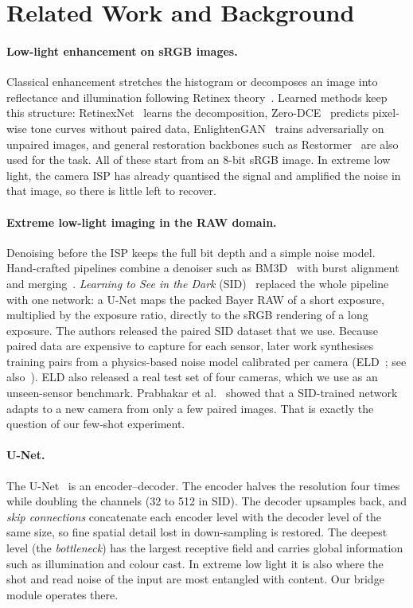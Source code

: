 \section{Related Work and Background}
\label{sec:related}

\paragraph{Low-light enhancement on sRGB images.}
Classical enhancement stretches the histogram or decomposes an image into reflectance and illumination following Retinex theory~\cite{land1977retinex}. Learned methods keep this structure: RetinexNet~\cite{wei2018retinexnet} learns the decomposition, Zero-DCE~\cite{guo2020zerodce} predicts pixel-wise tone curves without paired data, EnlightenGAN~\cite{jiang2021enlightengan} trains adversarially on unpaired images, and general restoration backbones such as Restormer~\cite{zamir2022restormer} are also used for the task. All of these start from an 8-bit sRGB image. In extreme low light, the camera ISP has already quantised the signal and amplified the noise in that image, so there is little left to recover.

\paragraph{Extreme low-light imaging in the RAW domain.}
Denoising before the ISP keeps the full bit depth and a simple noise model. Hand-crafted pipelines combine a denoiser such as BM3D~\cite{dabov2007bm3d} with burst alignment and merging~\cite{hasinoff2016burst}. \emph{Learning to See in the Dark} (SID)~\cite{chen2018sid} replaced the whole pipeline with one network: a U-Net maps the packed Bayer RAW of a short exposure, multiplied by the exposure ratio, directly to the sRGB rendering of a long exposure. The authors released the paired SID dataset that we use. Because paired data are expensive to capture for each sensor, later work synthesises training pairs from a physics-based noise model calibrated per camera (ELD~\cite{wei2020eld,wei2021eldpami}; see also~\cite{zhang2021rethinking}). ELD also released a real test set of four cameras, which we use as an unseen-sensor benchmark. Prabhakar et al.~\cite{prabhakar2021fewshot} showed that a SID-trained network adapts to a new camera from only a few paired images. That is exactly the question of our few-shot experiment.

\paragraph{U-Net.}
The U-Net~\cite{ronneberger2015unet} is an encoder--decoder. The encoder halves the resolution four times while doubling the channels (32 to 512 in SID). The decoder upsamples back, and \emph{skip connections} concatenate each encoder level with the decoder level of the same size, so fine spatial detail lost in down-sampling is restored. The deepest level (the \emph{bottleneck}) has the largest receptive field and carries global information such as illumination and colour cast. In extreme low light it is also where the shot and read noise of the input are most entangled with content. Our bridge module operates there.

